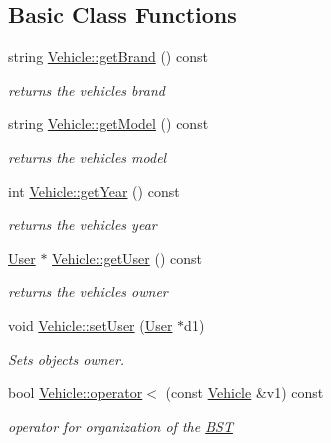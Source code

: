 \subsection*{Basic Class Functions}
\begin{DoxyCompactItemize}
\item 
string \hyperlink{group___vehicle_ga6d5f105e83177b3738a639e4e613218f}{Vehicle\+::get\+Brand} () const
\begin{DoxyCompactList}\small\item\em returns the vehicle\textquotesingle{}s brand \end{DoxyCompactList}\item 
string \hyperlink{group___vehicle_ga42379788d946d27ab81851461cb56a49}{Vehicle\+::get\+Model} () const
\begin{DoxyCompactList}\small\item\em returns the vehicle\textquotesingle{}s model \end{DoxyCompactList}\item 
int \hyperlink{group___vehicle_gaa3933383210a75d4c37b66d918ab1526}{Vehicle\+::get\+Year} () const
\begin{DoxyCompactList}\small\item\em returns the vehicle\textquotesingle{}s year \end{DoxyCompactList}\item 
\hyperlink{class_user}{User} $\ast$ \hyperlink{group___vehicle_ga8ca5c5a020a718d9c320bd4b5c034cfe}{Vehicle\+::get\+User} () const
\begin{DoxyCompactList}\small\item\em returns the vehicle\textquotesingle{}s owner \end{DoxyCompactList}\item 
void \hyperlink{group___vehicle_gaeea0b2b24f03a98cc6d1c5ad1c9ece73}{Vehicle\+::set\+User} (\hyperlink{class_user}{User} $\ast$d1)
\begin{DoxyCompactList}\small\item\em Sets object\textquotesingle{}s owner. \end{DoxyCompactList}\item 
bool \hyperlink{group___vehicle_ga3e144f33207edd2cdbabcbefea1f3269}{Vehicle\+::operator$<$} (const \hyperlink{class_vehicle}{Vehicle} \&v1) const
\begin{DoxyCompactList}\small\item\em operator for organization of the \hyperlink{class_b_s_t}{B\+ST} \end{DoxyCompactList}\end{DoxyCompactItemize}


